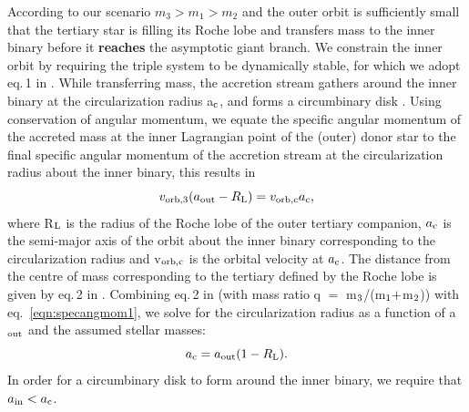 \documentclass[twocolumn]{aastex62}
\begin{document}
According to our scenario $m_3 > m_1 > m_2$ and the outer orbit is
sufficiently small that the tertiary star is filling its Roche lobe
and transfers mass to the inner binary before it {\bf reaches} the asymptotic
giant branch. We constrain the inner orbit by requiring the triple
system to be dynamically stable, for which we adopt eq.\,1 in
\cite{1999ASIC..522..385M}.  While transferring mass, the accretion
stream gathers around the inner binary at the circularization radius
a$_{\rm c}$, and forms a circumbinary disk
\citep{2002apa..book.....F}.  Using conservation of angular momentum,
we equate the specific angular momentum of the accreted mass at the
inner Lagrangian point of the (outer) donor star to the final specific
angular momentum of the accretion stream at the circularization radius
about the inner binary, this results in
\begin{equation}
\label{eqn:specangmom1}
v_{\rm orb,3}(a_{\rm out} - R_{\rm L}) = v_{\rm orb,c}a_{\rm c},
\end{equation}
where R$_{\rm L}$ is the radius of the Roche lobe of the outer
tertiary companion, $a_{\rm c}$ is the semi-major axis of the orbit
about the inner binary corresponding to the circularization radius and
v$_{\rm orb,c}$ is the orbital velocity at $a_{\rm c}$.  The distance
from the centre of mass corresponding to the tertiary defined by the
Roche lobe is given by eq.\,2 in \cite{1983ApJ...268..368E}.
Combining eq.\,2 in \citet{1983ApJ...268..368E} (with mass ratio q
$=$ m$_{\rm 3}$/(m$_{\rm 1} +$m$_{\rm 2}$)) with
eq.~\ref{eqn:specangmom1}, we solve for the circularization
radius as a function of a$_{\rm out}$ and the assumed stellar masses:
\begin{equation}
\label{eqn:ac}
a_{\rm c} = a_{\rm out}(1 - R_{\rm L}).
\end{equation}
In order for a circumbinary disk to form around the inner binary, we
require that $a_{\rm in} < a_{\rm c}$.
\end{document}
